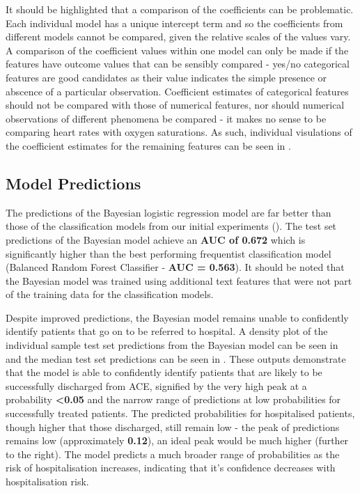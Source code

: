 It should be highlighted that a comparison of the coefficients can be problematic. Each individual model has a unique intercept term and so the coefficients from different models cannot be compared, given the relative scales of the values vary. A comparison of the coefficient values within one model can only be made if the features have outcome values that can be sensibly compared - yes/no categorical features are good candidates as their value indicates the simple presence or abscence of a particular observation. Coefficient estimates of categorical features should not be compared with those of numerical features, nor should numerical observations of different phenomena be compared - it makes no sense to be comparing heart rates with oxygen saturations. As such, individual visulations of the coefficient estimates for the remaining features can be seen in .


\subsection{Model Predictions}\label{subsec:model-predictions}

The predictions of the Bayesian logistic regression model are far better than those of the classification models from our initial experiments (). The test set predictions of the Bayesian model achieve an \textbf{AUC of 0.672} which is significantly higher than the best performing frequentist classification model (Balanced Random Forest Classifier - \textbf{AUC = 0.563}). It should be noted that the Bayesian model was trained using additional text features that were not part of the training data for the classification models.

Despite improved predictions, the Bayesian model remains unable to confidently identify patients that go on to be referred to hospital. A density plot of the individual sample test set predictions from the Bayesian model can be seen in  and the median test set predictions can be seen in . These outputs demonstrate that the model is able to confidently identify patients that are likely to be successfully discharged from ACE, signified by the very high peak at a probability \textbf{\textless0.05} and the narrow range of predictions at low probabilities for successfully treated patients. The predicted probabilities for hospitalised patients, though higher that those discharged, still remain low - the peak of predictions remains low (approximately \textbf{0.12}), an ideal peak would be much higher (further to the right). The model predicts a much broader range of probabilities as the risk of hospitalisation increases, indicating that it's confidence decreases with hospitalisation risk.

